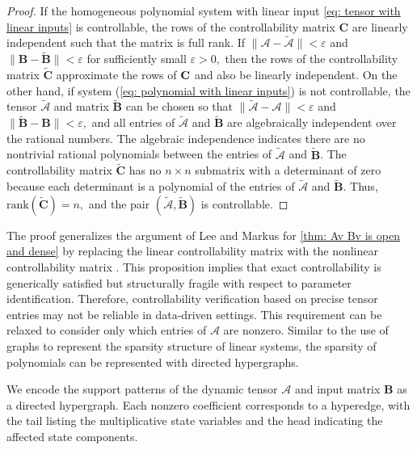 \documentclass[journal,twoside,web]{ieeecolor}
\begin{document}
\begin{proof}
    If the homogeneous polynomial system with linear input \eqref{eq: tensor with linear inputs} is controllable, the rows of the controllability matrix $\textbf{C}$ are linearly independent such that the matrix is full rank.
    If $\|\mathscr{A}-\tilde{\mathscr{A}}\|<\varepsilon$ and $\|\textbf{B}-\tilde{\textbf{B}}\|<\varepsilon$ for sufficiently small $\varepsilon>0,$ then the rows of the controllability matrix $\tilde{\textbf{C}}$ approximate the rows of $\textbf C$ and also be linearly independent. On the other hand, if system (\ref{eq: polynomial with linear inputs}) is not controllable, the tensor $\tilde{\mathscr{A}}$ and matrix $\tilde{\textbf{B}}$ can be chosen so that $\|\tilde{\mathscr{A}}-\mathscr{A}\|<\varepsilon$ and $\|\tilde{\textbf{B}}-\textbf{B}\|<\varepsilon,$ and all entries of $\tilde{\mathscr{A}}$ and $\tilde{\textbf{B}}$ are algebraically independent over the rational numbers. The algebraic independence indicates there are no nontrivial rational polynomials between the entries of $\tilde{\mathscr{A}}$ and $\tilde{\textbf{B}}$.
    The controllability matrix $\tilde{\textbf{C}}$ has no $n\times n$ submatrix with a determinant of zero because each determinant is a polynomial of the entries of $\tilde{\mathscr{A}}$ and $\tilde{\textbf{B}}$. Thus, $\text{rank}(\tilde{\textbf{C}})=n,$ and the pair $(\tilde{\mathscr{A}},\tilde{\textbf{B}})$ is controllable.
\end{proof}



The proof generalizes the argument of Lee and Markus for \cref{thm: Av Bv is open and dense} by replacing the linear controllability matrix with the nonlinear controllability matrix \cite{lee1967foundations}. This proposition implies that exact controllability is generically satisfied but structurally fragile with respect to parameter identification. Therefore, controllability verification based on precise tensor entries may not be reliable in data-driven settings. This requirement can be relaxed to consider only which entries of $\mathscr{A}$ are nonzero. Similar to the use of graphs to represent the sparsity structure of linear systems, the sparsity of polynomials can be represented with directed hypergraphs.

We encode the support patterns of the dynamic tensor $\mathscr{A}$ and input matrix $\textbf{B}$ as a directed hypergraph. Each nonzero coefficient corresponds to a hyperedge, with the tail listing the multiplicative state variables and the head indicating the affected state components.
\end{document}
